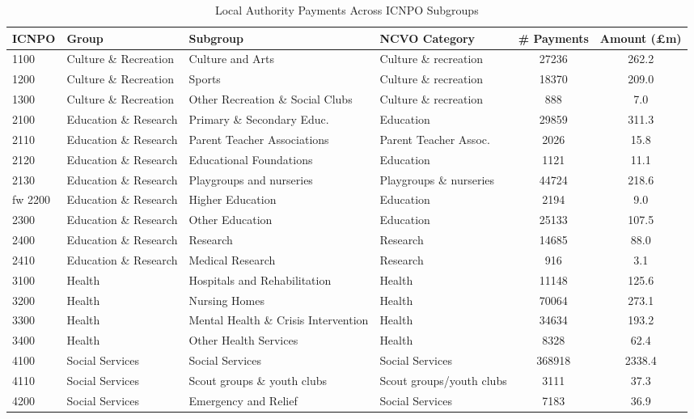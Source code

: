 \documentclass[11pt]{article}
\begin{document}
\begin{table}[!t]
\centering
\caption{Local Authority Payments Across ICNPO Subgroups}
\label{subgrouptable}
\scriptsize
\begin{tabular}{llllcc}\toprule
ICNPO & Group & Subgroup & NCVO Category  &\# Payments & Amount (£m) \\ \midrule
1100  & Culture \& Recreation & Culture and Arts & Culture \& recreation & 27236 & 262.2 \\
1200  & Culture \& Recreation & Sports & Culture \& recreation & 18370 & 209.0 \\
1300  & Culture \& Recreation  & Other Recreation \& Social Clubs & Culture \& recreation  & 888 & 7.0 \\
2100  & Education \& Research & Primary \& Secondary Educ. & Education & 29859 & 311.3 \\
2110  & Education \& Research & Parent Teacher Associations & Parent Teacher Assoc.  & 2026 & 15.8 \\
2120  & Education \& Research & Educational Foundations  & Education  & 1121 & 11.1 \\
2130  & Education \& Research & Playgroups and nurseries & Playgroups \& nurseries   & 44724  & 218.6   \\fw		
2200  & Education \& Research & Higher Education  & Education  & 2194 & 9.0  \\
2300  & Education \& Research & Other Education & Education  & 25133  & 107.5   \\
2400  & Education \& Research & Research   & Research   & 14685  & 88.0 \\
2410  & Education \& Research & Medical Research  & Research   & 916  & 3.1  \\
3100  & Health & Hospitals and Rehabilitation & Health   & 11148  & 125.6   \\
3200  & Health & Nursing Homes   & Health   & 70064  & 273.1   \\
3300  & Health & Mental Health \& Crisis Intervention  & Health   & 34634  & 193.2   \\
3400  & Health & Other Health Services  & Health   & 8328 & 62.4 \\
4100  & Social Services & Social Services & Social Services  & 368918 & 2338.4  \\
4110  & Social Services & Scout groups \& youth clubs & Scout groups/youth clubs & 3111 & 37.3 \\
4200  & Social Services & Emergency and Relief   & Social Services  & 7183 & 36.9 \\

\end{tabular}
\end{table}
\end{document}
